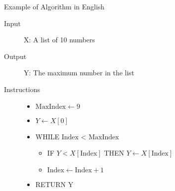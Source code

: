     \begin{frame}{Example of Algorithm in English}
    \begin{description}
    \item [Input] X: A list of 10 numbers
    \item [Output] Y: The maximum number in the list
    \item [Instructions]
    \begin{itemize}
    \item $\text{MaxIndex} \leftarrow 9$
    \item $Y \leftarrow X[0]$
    \item WHILE $\text{Index}$ < $\text{MaxIndex}$
    \begin{itemize}
    \item IF $Y < X[\text{Index}]$ THEN $Y \leftarrow X[\text{Index}]$
    \item $\text{Index} \leftarrow \text{Index} + 1$
    \end{itemize}
    \item RETURN Y
    \end{itemize}
    \end{description}
    \end{frame} 